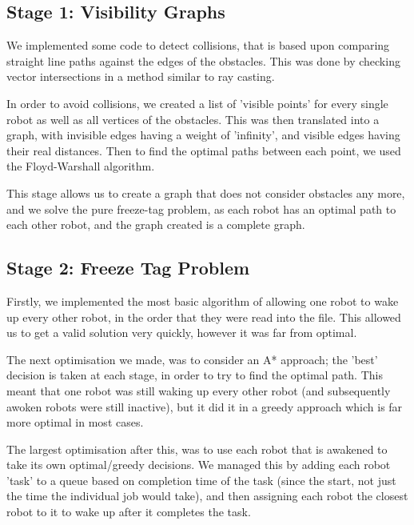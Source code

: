 \documentclass[12pt]{article}
\begin{document}
\subsection{Stage 1: Visibility Graphs}
We implemented some code to detect collisions, that is based upon comparing straight line paths against the edges of the obstacles. This was done by checking vector intersections in a method similar to ray casting. 
\par

In order to avoid collisions, we created a list of 'visible points' for every single robot as well as all vertices of the obstacles. This was then translated into a graph, with invisible edges having a weight of 'infinity', and visible edges having their real distances. Then to find the optimal paths between each point, we used the Floyd-Warshall algorithm. 
\par

This stage allows us to create a graph that does not consider obstacles any more, and we solve the pure freeze-tag problem, as each robot has an optimal path to each other robot, and the graph created is a complete graph.

\subsection{Stage 2: Freeze Tag Problem}
Firstly, we implemented the most basic algorithm of allowing one robot to wake up every other robot, in the order that they were read into the file. This allowed us to get a valid solution very quickly, however it was far from optimal.
\par

The next optimisation we made, was to consider an A* approach; the 'best' decision is taken at each stage, in order to try to find the optimal path. This meant that one robot was still waking up every other robot (and subsequently awoken robots were still inactive), but it did it in a greedy approach which is far more optimal in most cases.
\par
 
The largest optimisation after this, was to use each robot that is awakened to take its own optimal/greedy decisions. We managed this by adding each robot 'task' to a queue based on completion time of the task (since the start, not just the time the individual job would take), and then assigning each robot the closest robot to it to wake up after it completes the task. 
\par
\end{document}
